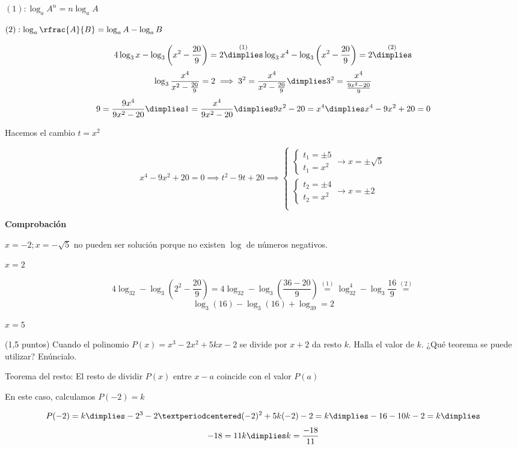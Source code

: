 \documentclass[palatino,nosec]{Docencia}
\begin{document}
\begin{problem}
\spart 
$(1): \log_aA^n = n\log_aA$

$(2): \log_a\rfrac{A}{B} = \log_aA-\log_aB$

\[
4\log_3x-\log_3\left(x^2-\frac{20}{9}\right) = 2 \overset{(1)}{\dimplies} \log_3x^4-\log_3\left(x^2-\frac{20}{9}\right) = 2 \overset{(2)}{\dimplies}
\]
\[
\log_3\frac{x^4}{x^2-\frac{20}{9}} = 2 \implies 3^2 = \frac{x^4}{x^2-\frac{20}{9}} \dimplies  3^2 = \frac{x^4}{\frac{9x^2-20}{9}} \]
\[
	9 = \frac{9x^4}{9x^2-20} \dimplies  1 = \frac{x^4}{9x^2-20} \dimplies 9x^2-20 = x^4 \dimplies x^4-9x^2+20=0
\]

Hacemos el cambio $t=x^2$

\[
x^4-9x^2+20=0 \implies t^2-9t+20 \implies \left\{
	\begin{array}{l}
		\left\{\begin{array}{l}
			t_1 = \pm5\\
			t_1 = x^2
			\end{array}
		\right.\to x=\pm\sqrt{5}\\
		\left\{\begin{array}{l}
			t_2 = \pm4\\
			t_2 = x^2
			\end{array}
		\right.\to x=\pm2\\
	\end{array}
\right.
\]

\textbf{Comprobación}

$x=-2;x=-\sqrt{5}$ no pueden ser solución porque no existen $\log$ de números negativos.

$x=2$

\[
	4\log_32-\log_3\left(2^2-\frac{20}{9}\right) = 4\log_32 - \log_3\left(\frac{36-20}{9}\right) \overset{(1)}{=} \log_32^4 - \log_3\frac{16}{9} \overset{(2)}{=}
\]
\[
	\log_3(16) - \log_3(16) + \log_39 = 2
\]

$x=5$

\end{problem}


\begin{problem}(1,5 puntos)
Cuando el polinomio $P(x) = x^3-2x^2+5kx-2$ se divide por $x+2$ da resto $k$. Halla el valor de $k$. ¿Qué teorema se puede utilizar? Enúncialo.

\solution
Teorema del resto: El resto de dividir $P(x)$ entre $x-a$ coincide con el valor $P(a)$

En este caso, calculamos $P(-2)=k$

\[
	P(-2) = k \dimplies -2^3-2·(-2)^2+5k(-2)-2= k \dimplies -16-10k-2=k\dimplies
\]
\[
	-18=11k \dimplies k=\frac{-18}{11}
\]


\end{problem}
\end{document}
